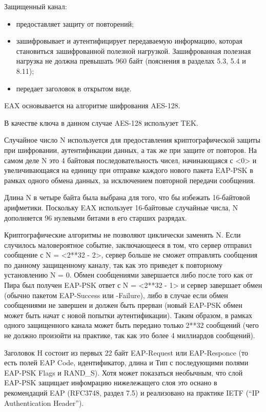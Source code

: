 Защищенный канал:

\begin{itemize}
\item предоставляет защиту от повторений;
\item зашифровывает и аутентифицирует передаваемую информацию, которая становиться зашифрованной полезной нагрузкой. Зашифрованная полезная нагрузка не должна превышать 960 байт (пояснения в разделах 5.3, 5.4 и 8.11);
\item передает заголовок в открытом виде.
\end{itemize}

EAX основывается на алгоритме шифрования AES-128.

В качестве ключа в данном случае AES-128 испольузет TEK.

Случайное число N используется для предоставления криптографической защиты при шифровании, аутентификации данных, а так же при защите от повторов. На самом деле N это 4 байтовая последовательность чисел, начинающаяся с <0> и увеличивающаяся на единицу при отправке каждого нового пакета EAP-PSK в рамках одного обмена данных, за исключением повторной передачи сообщения.

Длина N в четыре байта была выбрана для того, что бы избежать 16-байтовой арифметики. Поскольку EAX использует 16-байтовые случайные числа, N дополняется 96 нулевыми битами в его старших разрядах.

Криптографические алгоритмы не позволяют циклически заменять N. Если случилось маловероятное событие, заключающееся в том, что сервер отправил сообщение с N = <2**32 - 2>, сервер больше не сможет отправлять сообщения по данному защищенному каналу, так как это приведет к повторному установлению N = 0. Обмен сообщениями завершается либо после того как от Пира был получен EAP-PSK ответ с N = <2**32 - 1> и сервер завершает обмен (обычно пакетом EAP-Success или -Failure), либо в случае если обмен сообщениями не завершен и должен быть прерван (новый EAP-PSK обмен может быть начат с новой попытки аутентификации). Таким образом, в рамках одного защищенного канала может быть передано только 2**32 сообщений (чего не должно произойти на практике, так как это более 4 миллиардов сообщений).

Заголовок H состоит из первых 22 байт EAP-Request или EAP-Responce (то есть полей EAP Code, идентификатор, длина и Тип с последующими полями EAP-PSK Flags и RAND\_S). Хотя может показаться необычным, что слой EAP-PSK защищает инфомрацию нижележащего слоя это оснано в рекомендаций EAP (RFC3748, раздел 7.5) и реализовано на практике IETF (``IP Authentication Header'').

